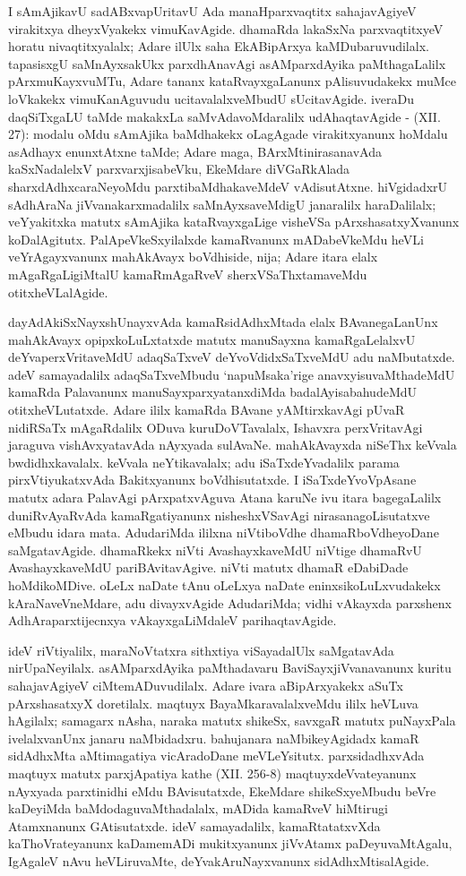 I sAmAjikavU sadABxvapUritavU Ada manaHparxvaqtitx sahajavAgiyeV vira\-kitxya dheyxVyakekx vimuKavAgide. dhamaRda lakaSxNa parxvaqtitxyeV horatu nivaqtitxyalalx; Adare ilUlx saha EkABipArxya kaMDubaruvudilalx. tapasisxgU saMnAyxsakUkx parxdhAnavAgi asAMparxdAyika paMthagaLalilx pArxmuKayxvuMTu, Adare tananx kataRvayxgaLanunx pAlisuvu\-dakekx muMce loVkakekx vimuKanAguvudu ucitavalalxveMbudU sUcitavAgide. iveraDu daqSiTxgaLU taMde makakxLa saMvAdavoMdaralilx udAhaqtavAgide - {\rm(XII. 27)}: modalu oMdu sAmAjika baMdhakekx oLagAgade virakitxyanunx hoMdalu asAdhayx enunxtAtxne taMde; Adare maga, BArxMtinirasanavAda kaSxNadalelxV parxvarxjisabeVku, EkeMdare diVGaRkAlada sharxdAdhxcaraNeyoMdu parxtibaMdhakaveMdeV vAdisutAtxne. hiVgidadxrU sAdhAraNa jiVvanakarxmadalilx saMnAyxsaveMdigU janaralilx haraDalilalx; veYyakitxka matutx sAmAjika kataRvayxgaLige visheVSa pArxshasatxyXvanunx koDalAgitutx. PalApeVkeSxyilalxde kamaRvanunx mADabeVkeMdu heVLi veYrAgayxvanunx mahAkAvayx boVdhiside, nija; Adare itara elalx mAgaRgaLigiMtalU kamaRmAgaRveV sherxVSaThxtamaveMdu otitxheVLalAgide.

dayAdAkiSxNayxshUnayxvAda kamaRsidAdhxMtada elalx BAvanegaLanUnx mahAkAvayx opipxkoLuLxtatxde matutx manuSayxna kamaRgaLelalxvU deYvaperxVritaveMdU adaqSaTxveV deYvoVdidxSaTxveMdU adu naMbutatxde. adeV samayadalilx adaqSaTxveMbudu `napuMsaka'rige anavxyisuvaMthadeMdU kamaRda Palavanunx manuSayxparxyatanxdiMda badalAyisabahudeMdU otitxheVLutatxde. Adare ililx kamaRda BAvane yAMtirxkavAgi pUvaR nidiRSaTx mAgaRdalilx ODuva kuruDoVTavalalx, Ishavxra perxVritavAgi jaraguva vishAvxyatavAda nAyxyada sulAvaNe. mahAkAvayxda niSeThx keVvala bwdidhxkavalalx. keVvala neYtikavalalx; adu iSaTxdeYvadalilx parama pirxVtiyukatxvAda Bakitxyanunx boVdhisutatxde. I iSaTxdeYvoVpAsane matutx adara PalavAgi pArxpatxvAguva Atana karuNe ivu itara bagegaLalilx duniRvAyaRvAda kamaRgatiyanunx nisheshxVSavAgi nirasanagoLisutatxve eMbudu idara mata. AdudariMda ililxna niVtiboVdhe dhamaRboVdheyoDane saMgatavAgide. dhamaRkekx niVti AvashayxkaveMdU niVtige dhamaRvU AvashayxkaveMdU pariBAvitavAgive. niVti matutx dhamaR eDabiDade hoMdikoMDive. oLeLx naDate tAnu oLeLxya naDate eninxsikoLuLxvudakekx kAraNaveVneMdare, adu divayxvAgide AdudariMda; vidhi vAkayxda parxshenx AdhAraparxtijecnxya vAkayxgaLiMdaleV parihaqtavAgide.

ideV riVtiyalilx, maraNoVtatxra sithxtiya viSayadalUlx saMgatavAda nirUpaNe\-yilalx. asAMparxdAyika paMthadavaru BaviSayxjiVvanavanunx kuritu sahajavAgiyeV ciMtemADuvudilalx. Adare ivara aBipArxyakekx aSuTx pArxshasatxyX doretilalx. maqtuyx BayaMkaravalalxveMdu ililx heVLuva hAgilalx; samagarx nAsha, naraka matutx shikeSx, savxgaR matutx puNayxPala ivelalxvanUnx janaru naMbidadxru. bahujanara naMbikeyAgidadx kamaR sidAdhxMta aMtimagatiya vicAradoDane meVLeYsitutx. parxsidadhxvAda maqtuyx matutx parxjApatiya kathe {\rm(XII. 256-8)} maqtuyxdeVvateyanunx nAyxyada parxtinidhi eMdu BAvisutatxde, EkeMdare shikeSxyeMbudu beVre kaDeyiMda baMdodaguvaMthadalalx, mADida kamaRveV hiMtirugi Atamxnanunx GAtisutatxde. ideV samayadalilx, kamaRtatatxvXda kaThoVrateyanunx kaDamemADi mukitxyanunx jiVvAtamx paDeyuvaMtAgalu, IgAgaleV nAvu heVLiruvaMte, deYvakAruNayxvanunx sidAdhxMtisalAgide.

